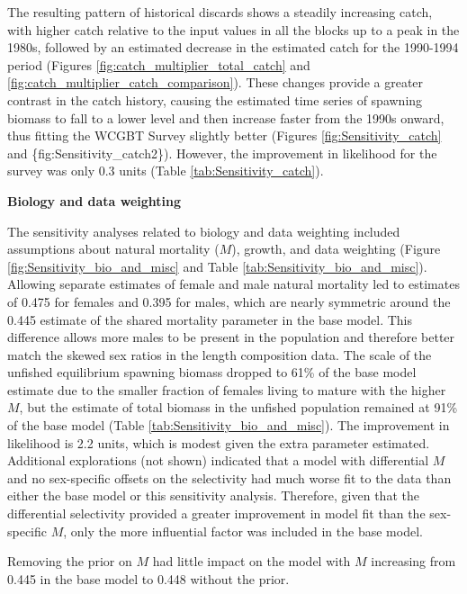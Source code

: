 \documentclass[12pt,]{article}
\begin{document}
The resulting pattern of historical discards shows a steadily increasing
catch, with higher catch relative to the input values in all the blocks
up to a peak in the 1980s, followed by an estimated decrease in the
estimated catch for the 1990-1994 period (Figures
\ref{fig:catch_multiplier_total_catch} and
\ref{fig:catch_multiplier_catch_comparison}). These changes provide a
greater contrast in the catch history, causing the estimated time series
of spawning biomass to fall to a lower level and then increase faster
from the 1990s onward, thus fitting the WCGBT Survey slightly better
(Figures \ref{fig:Sensitivity_catch} and \{fig:Sensitivity\_catch2\}).
However, the improvement in likelihood for the survey was only 0.3 units
(Table \ref{tab:Sensitivity_catch}).

\textbf{Biology and data weighting}

The sensitivity analyses related to biology and data weighting included
assumptions about natural mortality (\(M\)), growth, and data weighting
(Figure \ref{fig:Sensitivity_bio_and_misc} and Table
\ref{tab:Sensitivity_bio_and_misc}). Allowing separate estimates of
female and male natural mortality led to estimates of 0.475 for females
and 0.395 for males, which are nearly symmetric around the 0.445
estimate of the shared mortality parameter in the base model. This
difference allows more males to be present in the population and
therefore better match the skewed sex ratios in the length composition
data. The scale of the unfished equilibrium spawning biomass dropped to
61\% of the base model estimate due to the smaller fraction of females
living to mature with the higher \(M\), but the estimate of total
biomass in the unfished population remained at 91\% of the base model
(Table \ref{tab:Sensitivity_bio_and_misc}). The improvement in
likelihood is 2.2 units, which is modest given the extra parameter
estimated. Additional explorations (not shown) indicated that a model
with differential \(M\) and no sex-specific offsets on the selectivity
had much worse fit to the data than either the base model or this
sensitivity analysis. Therefore, given that the differential selectivity
provided a greater improvement in model fit than the sex-specific \(M\),
only the more influential factor was included in the base model.

Removing the prior on \(M\) had little impact on the model with \(M\)
increasing from 0.445 in the base model to 0.448 without the prior.
\end{document}
